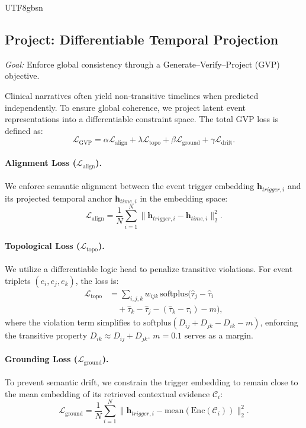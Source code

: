 \documentclass[11pt]{article}
\begin{document}
\begin{CJK*}{UTF8}{gbsn}
\subsection{Project: Differentiable Temporal Projection}
\textit{Goal:} Enforce global consistency through a Generate--Verify--Project (GVP) objective.

Clinical narratives often yield non-transitive timelines when predicted independently. To ensure global coherence, we project latent event representations into a differentiable constraint space. The total GVP loss is defined as:
\begin{equation}
\mathcal{L}_{\text{GVP}} = \alpha \mathcal{L}_{\text{align}} + \lambda \mathcal{L}_{\text{topo}} + \beta \mathcal{L}_{\text{ground}} + \gamma \mathcal{L}_{\text{drift}}.
\end{equation}

\paragraph{Alignment Loss ($\mathcal{L}_{\text{align}}$).}
We enforce semantic alignment between the event trigger embedding $\mathbf{h}_{trigger, i}$ and its projected temporal anchor $\mathbf{h}_{time, i}$ in the embedding space:
\begin{equation}
\mathcal{L}_{\text{align}} = \frac{1}{N} \sum_{i=1}^N \| \mathbf{h}_{trigger, i} - \mathbf{h}_{time, i} \|_2^2.
\end{equation}

\paragraph{Topological Loss ($\mathcal{L}_{\text{topo}}$).}
We utilize a differentiable logic head to penalize transitive violations. For event triplets $(e_i, e_j, e_k)$, the loss is:
\begin{equation}
\label{eq:topo_loss}
\begin{split}
\mathcal{L}_{\text{topo}} &= \sum_{i,j,k} w_{ijk}\,\text{softplus}(\hat{\tau}_j - \hat{\tau}_i \\ 
&\quad + \hat{\tau}_k - \hat{\tau}_j - (\hat{\tau}_k - \hat{\tau}_i) - m),
\end{split}
\end{equation}
where the violation term simplifies to $\text{softplus}(D_{ij} + D_{jk} - D_{ik} - m)$, enforcing the transitive property $D_{ik} \approx D_{ij} + D_{jk}$. $m=0.1$ serves as a margin.

\paragraph{Grounding Loss ($\mathcal{L}_{\text{ground}}$).}
To prevent semantic drift, we constrain the trigger embedding to remain close to the mean embedding of its retrieved contextual evidence $\mathcal{C}_i$:
\begin{equation}
\mathcal{L}_{\text{ground}} = \frac{1}{N} \sum_{i=1}^N \| \mathbf{h}_{trigger, i} - \text{mean}(\text{Enc}(\mathcal{C}_i)) \|_2^2.
\end{equation}


\end{CJK*}
\end{document}
